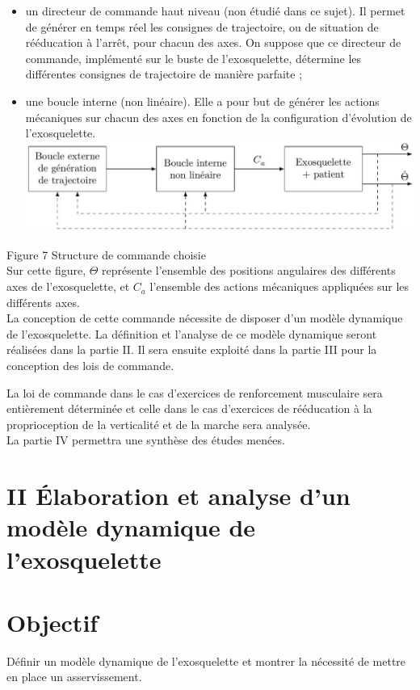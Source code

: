 \documentclass[10pt]{article}
\begin{document}
\begin{itemize}
  \item un directeur de commande haut niveau (non étudié dans ce sujet). Il permet de générer en temps réel les consignes de trajectoire, ou de situation de rééducation à l'arrêt, pour chacun des axes. On suppose que ce directeur de commande, implémenté sur le buste de l'exosquelette, détermine les différentes consignes de trajectoire de manière parfaite ;
  \item une boucle interne (non linéaire). Elle a pour but de générer les actions mécaniques sur chacun des axes en fonction de la configuration d'évolution de l'exosquelette.\\
\includegraphics[max width=\textwidth, center]{2025_07_03_97545f5dc188959e5663g-04}
\end{itemize}

Figure 7 Structure de commande choisie\\
Sur cette figure, $\Theta$ représente l'ensemble des positions angulaires des différents axes de l'exosquelette, et $C_{a}$ l'ensemble des actions mécaniques appliquées sur les différents axes.\\
La conception de cette commande nécessite de disposer d'un modèle dynamique de l'exosquelette. La définition et l'analyse de ce modèle dynamique seront réalisées dans la partie II. Il sera ensuite exploité dans la partie III pour la conception des lois de commande.

La loi de commande dans le cas d'exercices de renforcement musculaire sera entièrement déterminée et celle dans le cas d'exercices de rééducation à la proprioception de la verticalité et de la marche sera analysée.\\
La partie IV permettra une synthèse des études menées.

\section*{II Élaboration et analyse d'un modèle dynamique de l'exosquelette}
\section*{Objectif}
Définir un modèle dynamique de l'exosquelette et montrer la nécessité de mettre en place un asservissement.
\end{document}
